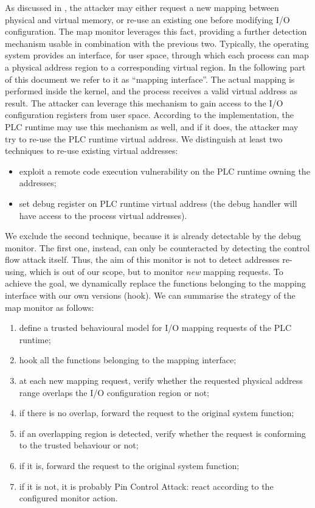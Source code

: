 As discussed in , the attacker may either request a new mapping between physical and virtual memory, or re-use an existing one before
modifying I/O configuration. The map monitor leverages this fact, providing a further detection mechanism usable in combination with the previous two.
Typically, the operating system provides an interface, for user space, through which each process can map a physical address region to a corresponding virtual region.
In the following part of this document we refer to it as ``mapping interface''.
The actual mapping is performed inside the kernel, and the process receives a valid virtual address as result.
The attacker can leverage this mechanism to gain access to the I/O configuration registers from user space.
According to the implementation, the PLC runtime may use this mechanism as well, and if it does, the attacker may try to re-use the PLC runtime virtual address.
We distinguish at least two techniques to re-use existing virtual addresses:
\begin{itemize}
	\item exploit a remote code execution vulnerability on the PLC runtime owning the addresses;
	\item set debug register on PLC runtime virtual address (the debug handler will have access to the process virtual addresses).
\end{itemize}
We exclude the second technique, because it is already detectable by the debug monitor. The first one, instead, can only be counteracted by detecting the control flow attack itself.
Thus, the aim of this monitor is not to detect addresses re-using, which is out of our scope, but to monitor \emph{new} mapping requests.
To achieve the goal, we dynamically replace the functions belonging to the mapping interface with our own versions (hook).
We can summarise the strategy of the map monitor as follows:
\begin{enumerate}
	\item \label{enum:map-model} define a trusted behavioural model for I/O mapping requests of the PLC runtime;
	\item hook all the functions belonging to the mapping interface;
	\item at each new mapping request, verify whether the requested physical address range overlaps the I/O configuration region or not;
	\item if there is no overlap, forward the request to the original system function;
	\item if an overlapping region is detected, verify whether the request is conforming to the trusted behaviour or not;
	\item if it is, forward the request to the original system function;
	\item if it is not, it is probably Pin Control Attack: react according to the configured monitor action.
\end{enumerate}
